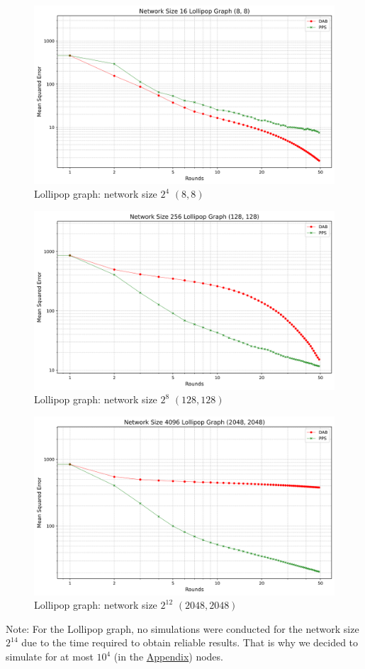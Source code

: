 \begin{figure}[H]
    \centering
    \includegraphics[scale=0.5]{figures/lollipopGraphSimulations/DAB_vs_PPS_LG_r50_n16.png}
    \caption{Lollipop graph: network size $2^{4}$ $(8, 8)$}
    \label{fig:8+8lollipop}
\end{figure}

\begin{figure}[H]
    \centering
    \includegraphics[scale=0.5]{figures/lollipopGraphSimulations/DAB_vs_PPS_LG_r50_n256.png}
    \caption{Lollipop graph: network size $2^{8}$ $(128, 128)$}
    \label{fig:128+128lollipop}
\end{figure}

\begin{figure}[H]
    \centering
    \includegraphics[scale=0.5]{figures/lollipopGraphSimulations/DAB_vs_PPS_LG_r50_n4096.png}
    \caption{Lollipop graph: network size $2^{12}$ $(2048, 2048)$}
    \label{fig:2048+2048lollipop}
\end{figure}

Note: For the Lollipop graph, no simulations were conducted for the network size $2^{14}$ due to the time required to obtain reliable results. That is why we decided to simulate for at most $10^{4}$ (in the \hyperref[chap:appendix]{Appendix}) nodes.
